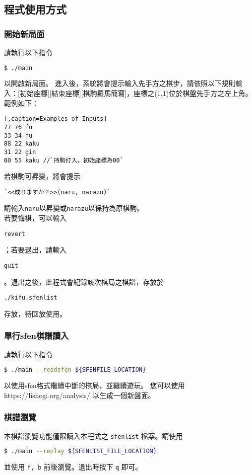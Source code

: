 \subsection{程式使用方式}



\subsubsection{開始新局面}
請執行以下指令
\begin{lstlisting}[language=sh,caption=Compile Parameters]
$ ./main	     
\end{lstlisting}
以開啟新局面。
進入後，系統將會提示輸入先手方之棋步，請依照以下規則輸入：[初始座標][結束座標][棋駒羅馬簡寫]，座標之(1,1)位於棋盤先手方之左上角。\\
範例如下：
\begin{lstlisting}[,caption=Examples of Inputs]
77 76 fu
33 34 fu
88 22 kaku
31 22 gin 
00 55 kaku //`持駒打入，初始座標為00`
\end{lstlisting}
若棋駒可昇變，將會提示
\begin{lstlisting}[]
`<<成りますか？>>(naru, narazu)`
\end{lstlisting}
請輸入\verb|naru|以昇變或\verb|narazu|以保持為原棋駒。\\
若要悔棋，可以輸入
\begin{lstlisting}[]
revert
\end{lstlisting}
；若要退出，請輸入
\begin{lstlisting}[]
quit
\end{lstlisting}
。退出之後，此程式會紀錄該次棋局之棋譜，存放於
\begin{lstlisting}[]
./kifu.sfenlist
\end{lstlisting}
存放，待回放使用。
\subsubsection{單行sfen棋譜讀入}
請執行以下指令
\begin{lstlisting}[language=sh,caption=Compile Parameters]
$ ./main --readsfen ${SFENFILE_LOCATION}	     
\end{lstlisting}
以使用sfen格式繼續中斷的棋局，並繼續遊玩。
您可以使用 \\https://lishogi.org/analysis/ 以生成一個新盤面。
\subsubsection{棋譜瀏覽}
本棋譜瀏覽功能僅限讀入本程式之 \verb|sfenlist| 檔案。請使用
\begin{lstlisting}[language=sh]
$ ./main --replay ${SFENLIST_FILE_LOCATION}	     
\end{lstlisting}
並使用 \verb|f, b| 前後瀏覽。退出時按下 \verb|q| 即可。 